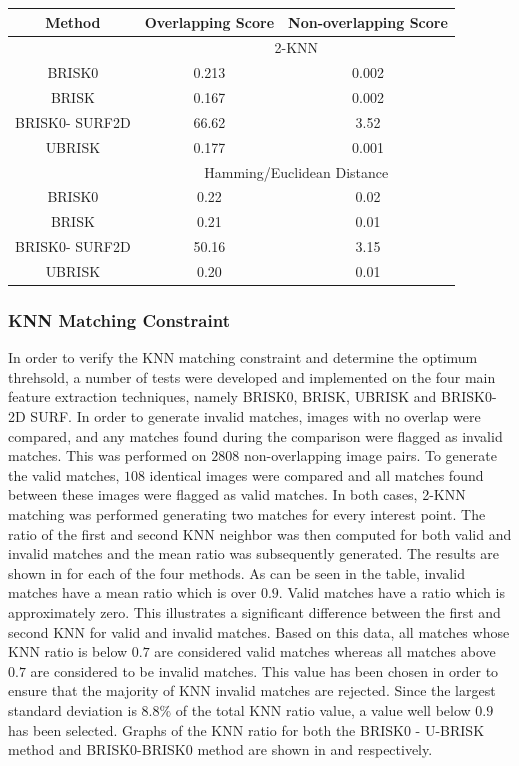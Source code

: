 \documentclass{article}
\begin{document}
\begin{table}
\begin{tabular}{|c|c|c|}
\hline 
Method & Overlapping Score & Non-overlapping Score\tabularnewline
\hline 
\hline 
 & \multicolumn{2}{c}{2-KNN}\tabularnewline
\hline 
BRISK0 & 0.213 & 0.002\tabularnewline
\hline 
BRISK & 0.167 & 0.002\tabularnewline
\hline 
BRISK0- SURF2D & 66.62 & 3.52\tabularnewline
\hline 
UBRISK & 0.177 & 0.001\tabularnewline
\hline 
 & \multicolumn{2}{c}{Hamming/Euclidean Distance}\tabularnewline
\hline 
BRISK0 & 0.22 & 0.02\tabularnewline
\hline 
BRISK & 0.21 & 0.01\tabularnewline
\hline 
BRISK0- SURF2D & 50.16 & 3.15\tabularnewline
\hline 
UBRISK & 0.20 & 0.01\tabularnewline
\hline 
\end{tabular}
\label{tab:matchingScoreCompare}
\end{table}

\subsubsection{KNN Matching Constraint}
\label{sec:knnMatchingConstraint}
In order to verify the KNN matching constraint and determine the optimum threhsold, a number of tests were developed and implemented on the four main feature extraction techniques, namely BRISK0, BRISK, UBRISK and BRISK0-2D SURF. In order to generate invalid matches, images with no overlap were compared, and any matches found during the comparison were flagged as invalid matches. This was performed on $2808$ non-overlapping image pairs. To generate the valid matches, $108$ identical images were compared and all matches found between these images were flagged as valid matches. In both cases, 2-KNN matching was performed generating two matches for every interest point. The ratio of the first and second KNN neighbor was then computed for both valid and invalid matches and the mean ratio was subsequently generated. The results are shown in  for each of the four methods. As can be seen in the table, invalid matches have a mean ratio which is over $0.9$. Valid matches have a ratio which is approximately zero. This illustrates a significant difference between the first and second KNN for valid and invalid matches. Based on this data, all matches whose KNN ratio is below $0.7$ are considered valid matches whereas all matches above $0.7$ are considered to be invalid matches. This value has been chosen in order to ensure that the majority of KNN invalid matches are rejected. Since the largest standard deviation is $8.8\%$ of the total KNN ratio value, a value well below $0.9$ has been selected. Graphs of the KNN ratio for both the BRISK0 - U-BRISK method and BRISK0-BRISK0 method are shown in  and  respectively. \\
\end{document}
